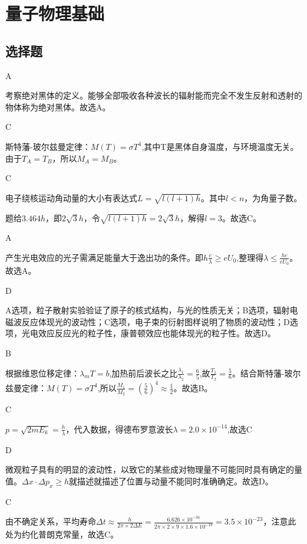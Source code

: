\chapter{量子物理基础}

\section{选择题}
\exercise A

\solve 考察绝对黑体的定义。能够全部吸收各种波长的辐射能而完全不发生反射和透射的物体称为绝对黑体。故选A。

\exercise C

\solve 斯特藩-玻尔兹曼定律：$M(T)=\sigma T^4$,其中T是黑体自身温度，与环境温度无关。由于$T_A=T_B$，所以$M_A=M_B$。

\exercise C

\solve 电子绕核运动角动量的大小有表达式$L=\sqrt{l(l+1)h}$。其中$l<n$，为角量子数。%

题给$3.464h$，即$2\sqrt{3}h$，令$\sqrt{l(l+1)h}=2\sqrt{3}h$，解得$l=3$。故选C。

\exercise A

\solve 产生光电效应的光子需满足能量大于逸出功的条件。即$h\frac{c}{\lambda}\ge eU_0$,整理得$\lambda \le\frac{hc}{eU_0}$。故选A。

\exercise D

\solve A选项，\alpha 粒子散射实验验证了原子的核式结构，与光的性质无关；B选项，辐射电磁波反应体现光的波动性；C选项，电子束的衍射图样说明了物质的波动性；D选项，光电效应反应光的粒子性，康普顿效应也能体现光的粒子性。故选D。

\exercise B

\solve 根据维恩位移定律：$\lambda_mT=b$,加热前后波长之比$\frac{\lambda_1}{\lambda_2}=\frac{6}{5}$,故$\frac{T_1}{T_2}=\frac{5}{6}$。结合斯特藩-玻尔兹曼定律：$M(T)=\sigma T^4$,所以$\frac{M_1}{M_2}=(\frac{5}{6})^4\approx\frac{1}{2}$。故选B。

\exercise C

\solve $p=\sqrt{2mE_k}=\frac{h}{\lambda}$，代入数据，得德布罗意波长$\lambda=2.0\times10^{-14}$,故选C

\exercise D

\solve 微观粒子具有的明显的波动性，以致它的某些成对物理量不可能同时具有确定的量值。$\Delta x\cdot \Delta p_x\ge h$就描述就描述了位置与动量不能同时准确确定。故选D。

\exercise C

\solve 由不确定关系，平均寿命$\Delta t\approx\frac{h}{2\pi\times2\Delta E}=\frac{6.626\times10^{-34}}{2\pi\times2\times9\times1.6\times10^{-19}}=3.5\times10^{-23}$，注意此处为约化普朗克常量，故选C。

